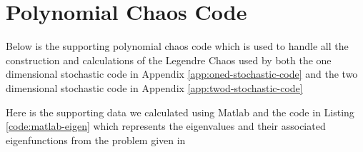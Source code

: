 \chapter{Polynomial Chaos Code}\label{app:poly-chaos-code}

Below is the supporting polynomial chaos code which is used to handle all the
construction and calculations of the Legendre Chaos used by both the one
dimensional stochastic code in Appendix \ref{app:oned-stochastic-code} and the
two dimensional stochastic code in Appendix \ref{app:twod-stochastic-code}



Here is the supporting data we calculated using Matlab and the code in Listing
\ref{code:matlab-eigen} which represents the eigenvalues and their associated
eigenfunctions from the problem given in

